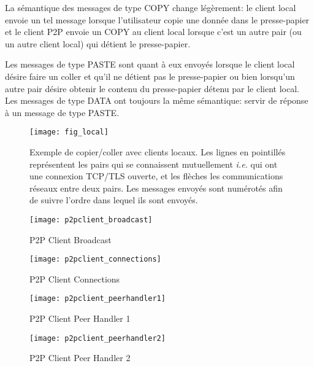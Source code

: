 La sémantique des messages de type COPY change légèrement: le client
local envoie un tel message lorsque l'utilisateur copie une donnée dans le
presse-papier et le client P2P envoie un COPY au client local lorsque
c'est un autre pair (ou un autre client local) qui détient le presse-papier.

Les messages de type PASTE sont quant à eux envoyés lorsque le client local
désire faire un coller et qu'il ne détient pas le presse-papier ou bien
lorsqu'un autre pair désire obtenir le contenu du presse-papier détenu par le
client local. Les messages de type DATA ont toujours la même sémantique:
servir de réponse à un message de type PASTE.

\begin{figure}[!h]
  \centering
  \texttt{[image: fig\_local]}
  \caption{Exemple de copier/coller avec clients locaux. Les lignes en
    pointillés représentent les pairs qui se connaissent mutuellement
    \emph{i.e.} qui ont une connexion TCP/TLS ouverte, et les flèches les
    communications réseaux entre deux pairs. Les messages envoyés sont
    numérotés afin de suivre l'ordre dans lequel ils sont envoyés.}
  \label{fig:local}
\end{figure}

\begin{figure}[!h]
  \centering
  \texttt{[image: p2pclient\_broadcast]}
  \caption{P2P Client Broadcast}
  \label{fig:p2pclient_broadcast}
\end{figure}

\begin{figure}[!h]
  \centering
  \texttt{[image: p2pclient\_connections]}
  \caption{P2P Client Connections}
  \label{fig:p2pclient_connections}
\end{figure}

\begin{figure}[!h]
  \centering
  \texttt{[image: p2pclient\_peerhandler1]}
  \caption{P2P Client Peer Handler 1}
  \label{fig:p2pclient_peerhandler1}
\end{figure}

\begin{figure}[!h]
  \centering
  \texttt{[image: p2pclient\_peerhandler2]}
  \caption{P2P Client Peer Handler 2}
  \label{fig:p2pclient_peerhandler2}
\end{figure}
